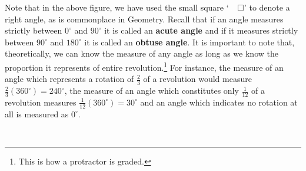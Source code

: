 \documentclass[12pt]{ximera}
\begin{document}
Note that in the above figure,  we have used the small square `$\! \! \! \! \! \! \qed$' to denote a right angle, as is commonplace in Geometry.  Recall that if an angle measures strictly between $0^{\circ}$ and $90^{\circ}$ it is called an \textbf{acute angle} and if it measures strictly between $90^{\circ}$ and $180^{\circ}$ it is called an \textbf{obtuse angle}. It is important to note that, theoretically, we can know the measure of any angle as long as we know the proportion it represents of entire revolution.\footnote{This is how a protractor is graded.}  For instance, the measure of an angle which represents a rotation of $\frac{2}{3}$ of a revolution would measure $\frac{2}{3} \left(360^{\circ}\right) = 240^{\circ}$,  the measure of an angle which constitutes only $\frac{1}{12}$ of a revolution measures $\frac{1}{12} \left(360^{\circ}\right) = 30^{\circ}$ and an angle which indicates no rotation at all is measured as $0^{\circ}$.

\[ \begin{array}{ccc}

 

&

\hspace{.5in}

 

&

\hspace{.5in}

 

\\  \end{array} \]
\end{document}
